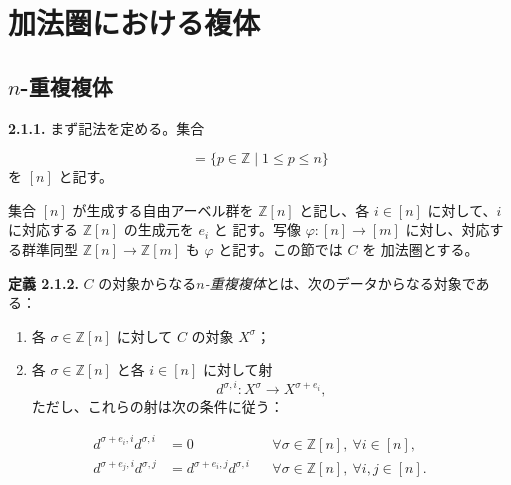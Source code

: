 \clearpage
{}%
\section{加法圏における複体}

\subsection{\texorpdfstring{$n$}{n}-重複複体}

\noindent\textbf{2.1.1.}\quad
まず記法を定める。集合

\begin{equation*}
  [n]=\{p\in\mathbb Z\mid 1\leq p\leq n\}
\end{equation*}
を $[n]$ と記す。

集合 $[n]$ が生成する自由アーベル群を $\mathbb Z[n]$ と記し、各
$i\in[n]$ に対して、$i$ に対応する $\mathbb Z[n]$ の生成元を $e_i$ と
記す。写像 $\varphi\colon[n]\to[m]$ に対し、対応する群準同型
$\mathbb Z[n]\to\mathbb Z[m]$ も $\varphi$ と記す。この節では $C$ を
加法圏とする。

\noindent\textbf{定義 2.1.2.}\quad
$C$ の対象からなる\emph{$n$-重複複体}とは、次のデータからなる対象である：

\begin{enumerate}
\renewcommand{\labelenumi}{\arabic{enumi})}
\item {}%
  各 $\sigma\in\mathbb Z[n]$ に対して $C$ の対象 $X^\sigma$；
\item {}%
  各 $\sigma\in\mathbb Z[n]$ と各 $i\in[n]$ に対して射
  \begin{equation*}
    d^{\sigma,i}\colon X^\sigma\longrightarrow X^{\sigma+e_i},
  \end{equation*}
  ただし、これらの射は次の条件に従う：
\end{enumerate}

\begin{equation}
  \begin{aligned}
    d^{\sigma+e_i,i}d^{\sigma,i}&=0
      &&\forall\sigma\in\mathbb Z[n],\ \forall i\in[n],\\
    d^{\sigma+e_j,i}d^{\sigma,j}
      &=d^{\sigma+e_i,j}d^{\sigma,i}
      &&\forall\sigma\in\mathbb Z[n],\ \forall i,j\in[n].
  \end{aligned}
  \tag{2.1.2.1}
\end{equation}

